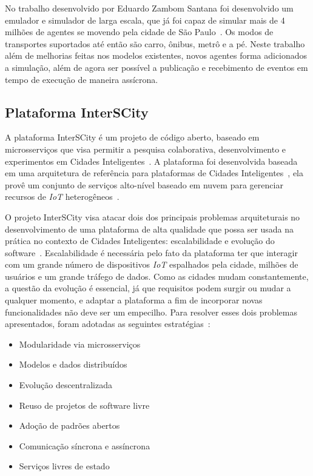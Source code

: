 No trabalho desenvolvido por Eduardo Zambom Santana foi desenvolvido um emulador e simulador de larga escala, que já foi capaz de simular mais de 4 milhões de
agentes se movendo pela cidade de São Paulo~\cite{santana_17}.
Os modos de transportes suportados até então são carro, ônibus, metrô e a pé.
Neste trabalho além de melhorias feitas nos modelos existentes, novos agentes forma adicionados a simulação, além de agora ser possível a publicação e recebimento de
eventos em tempo de execução de maneira assícrona.

\subsection{Plataforma InterSCity}

A plataforma InterSCity é um projeto de código aberto, baseado em microsserviços que visa permitir a pesquisa colaborativa, desenvolvimento e experimentos em Cidades
Inteligentes~\cite{arthur_17}.
A plataforma foi desenvolvida baseada em uma arquitetura de referência para plataformas de Cidades Inteligentes~\cite{santana_2016}, ela provê um conjunto de serviços
alto-nível baseado em nuvem para gerenciar recursos de \textit{IoT} heterogêneos~\cite{arthur_17}.

O projeto InterSCity visa atacar dois dos principais problemas arquiteturais no desenvolvimento de uma plataforma de alta qualidade que possa ser usada na prática no
contexto de Cidades Inteligentes: escalabilidade e evolução do software~\cite{arthur_17}.
Escalabilidade é necessária pelo fato da plataforma ter que interagir com um grande número de dispositivos \textit{IoT} espalhados pela cidade, milhões de usuários e
um grande tráfego de dados.
Como as cidades mudam constantemente, a questão da evolução é essencial, já que requisitos podem surgir ou mudar a qualquer momento, e adaptar a plataforma a fim de
incorporar novas funcionalidades não deve ser um empecilho.
Para resolver esses dois problemas apresentados, foram adotadas as seguintes estratégias~\cite{arthur_17}:

\begin{itemize}
	\item Modularidade via microsserviços
	\item Modelos e dados distribuídos
	\item Evolução descentralizada
	\item Reuso de projetos de software livre
	\item Adoção de padrões abertos
	\item Comunicação síncrona e assíncrona
	\item Serviços livres de estado
\end{itemize}

